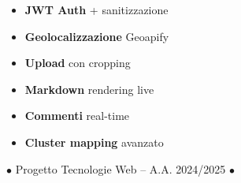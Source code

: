 \documentclass[11pt,a4paper]{article}
\begin{document}
\begin{minipage}[t]{0.5\textwidth}
{\normalsize
\begin{itemize}
\setlength{\itemsep}{0.12cm}
\setlength{\leftmargin}{0.3cm}
\item[\textcolor{secondary}{$\bullet$}] \textbf{JWT Auth} + sanitizzazione
\item[\textcolor{secondary}{$\bullet$}] \textbf{Geolocalizzazione} Geoapify
\item[\textcolor{secondary}{$\bullet$}] \textbf{Upload} con cropping
\end{itemize}
}
\end{minipage}
\begin{minipage}[t]{0.5\textwidth}
{\normalsize
\begin{itemize}
\setlength{\itemsep}{0.12cm}
\setlength{\leftmargin}{0.3cm}
\item[\textcolor{secondary}{$\bullet$}] \textbf{Markdown} rendering live
\item[\textcolor{secondary}{$\bullet$}] \textbf{Commenti} real-time
\item[\textcolor{secondary}{$\bullet$}] \textbf{Cluster mapping} avanzato
\end{itemize}
}
\end{minipage}

\vfill

\begin{center}
{\small\textcolor{dark!55}{$\bullet$ Progetto Tecnologie Web -- A.A. 2024/2025 $\bullet$}}
\end{center}
\end{document}
